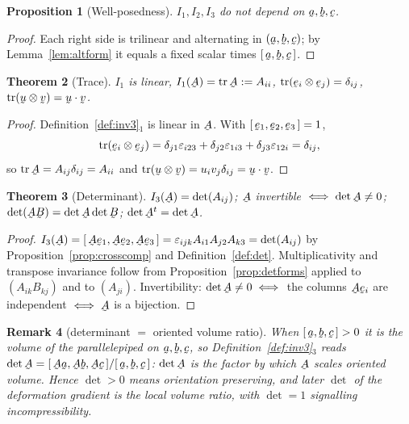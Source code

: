\documentclass[17pt,a4paper]{extreport}
\DeclareRobustCommand{\vek}[1]{\underaccent{\tilde}{#1}}
\newcommand{\tr}{\operatorname{tr}}
\newcommand{\ba}{\vek{a}}
\newcommand{\bb}{\vek{b}}
\newcommand{\bc}{\vek{c}}
\newcommand{\bu}{\vek{u}}
\newcommand{\bv}{\vek{v}}
\newcommand{\be}{\vek{e}}
\newcommand{\bA}{\vek{A}}
\newcommand{\bB}{\vek{B}}
\newcommand{\dd}{\delta}
\newcommand{\eps}{\varepsilon}
\newcommand{\tbox}[3]{[\,#1,#2,#3\,]}
\newcommand{\ip}[2]{#1\cdot#2}
\theoremstyle{scplain}
\newtheorem{theorem}{Theorem}[chapter]
\newtheorem{proposition}[theorem]{Proposition}
\theoremstyle{scdefn}
\newtheorem{remark}[theorem]{Remark}
\theoremstyle{scplain}
\begin{document}
\begin{proposition}[Well-posedness]\label{prop:invwd}
$I_{1},I_{2},I_{3}$ do not depend on $\ba,\bb,\bc$.
\end{proposition}

\begin{proof}
Each right side is trilinear and alternating in $(\ba,\bb,\bc)$; by
Lemma~\ref{lem:altform} it equals a fixed scalar times $\tbox\ba\bb\bc$.
\end{proof}

\begin{theorem}[Trace]\label{thm:trace}
$I_{1}$ is linear, $I_{1}(\bA)=\tr\bA:=A_{ii}$,
$\tr(\be_{i}\otimes\be_{j})=\dd_{ij}$, $\tr(\bu\otimes\bv)=\ip\bu\bv$.
\end{theorem}

\begin{proof}
Definition~\ref{def:inv3}$_1$ is linear in $\bA$. With $\tbox{\be_1}{\be_2}{\be_3}=1$,
\[
\tr(\be_{i}\otimes\be_{j})
=\dd_{j1}\eps_{i23}+\dd_{j2}\eps_{1i3}+\dd_{j3}\eps_{12i}=\dd_{ij},
\]
so $\tr\bA=A_{ij}\dd_{ij}=A_{ii}$ and $\tr(\bu\otimes\bv)=u_iv_j\dd_{ij}
=\ip\bu\bv$.
\end{proof}

\begin{theorem}[Determinant]\label{thm:det}
$I_{3}(\bA)=\det(A_{ij})$; $\bA$ invertible $\iff\det\bA\neq0$;
$\det(\bA\bB)=\det\bA\det\bB$; $\det\bA^{t}=\det\bA$.
\end{theorem}

\begin{proof}
$I_{3}(\bA)=\tbox{\bA\be_1}{\bA\be_2}{\bA\be_3}=\eps_{ijk}A_{i1}A_{j2}A_{k3}
=\det(A_{ij})$ by Proposition~\ref{prop:crosscomp} and
Definition~\ref{def:det}. Multiplicativity and transpose invariance follow
from Proposition~\ref{prop:detforms} applied to $(A_{ik}B_{kj})$ and to
$(A_{ji})$. Invertibility: $\det\bA\neq0\iff$ the columns $\bA\be_i$ are
independent $\iff\bA$ is a bijection.
\end{proof}

\begin{remark}[determinant $=$ oriented volume ratio]\label{rem:vol}
When $\tbox\ba\bb\bc>0$ it is the volume of the parallelepiped on
$\ba,\bb,\bc$, so Definition~\ref{def:inv3}$_3$ reads
$\det\bA=\tbox{\bA\ba}{\bA\bb}{\bA\bc}/\tbox\ba\bb\bc$: $\det\bA$ is the
factor by which $\bA$ scales oriented volume. Hence $\det>0$ means
orientation preserving, and later $\det$ of the deformation gradient is the
local volume ratio, with $\det=1$ signalling incompressibility.
\end{remark}
\end{document}
